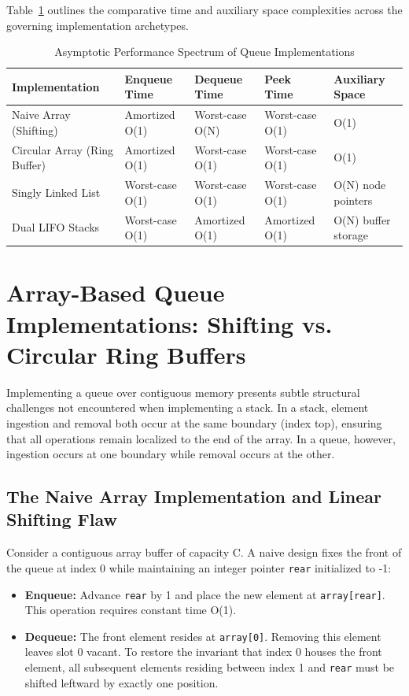 \documentclass[10pt,journal,compsoc,onecolumn]{IEEEtran}
\begin{document}
Table~\ref{tab:queue_implementations_comparison} outlines the comparative time and auxiliary space complexities across the governing implementation archetypes.

\begin{table}[htbp]
\centering
\caption{Asymptotic Performance Spectrum of Queue Implementations}
\label{tab:queue_implementations_comparison}
\begin{tabular}{lllll}
\toprule
\textbf{Implementation} & \textbf{Enqueue Time} & \textbf{Dequeue Time} & \textbf{Peek Time} & \textbf{Auxiliary Space} \\
\midrule
Naive Array (Shifting) & Amortized O(1) & Worst-case O(N) & Worst-case O(1) & O(1) \\
Circular Array (Ring Buffer) & Amortized O(1) & Worst-case O(1) & Worst-case O(1) & O(1) \\
Singly Linked List & Worst-case O(1) & Worst-case O(1) & Worst-case O(1) & O(N) node pointers \\
Dual LIFO Stacks & Worst-case O(1) & Amortized O(1) & Amortized O(1) & O(N) buffer storage \\
\bottomrule
\end{tabular}
\end{table}

\section{Array-Based Queue Implementations: Shifting vs. Circular Ring Buffers}
\label{sec:array_queue}

Implementing a queue over contiguous memory presents subtle structural challenges not encountered when implementing a stack. In a stack, element ingestion and removal both occur at the same boundary (index top), ensuring that all operations remain localized to the end of the array. In a queue, however, ingestion occurs at one boundary while removal occurs at the other.

\subsection{The Naive Array Implementation and Linear Shifting Flaw}

Consider a contiguous array buffer of capacity C. A naive design fixes the front of the queue at index 0 while maintaining an integer pointer \texttt{rear} initialized to -1:
\begin{itemize}
    \item \textbf{Enqueue:} Advance \texttt{rear} by 1 and place the new element at \texttt{array[rear]}. This operation requires constant time O(1).
    \item \textbf{Dequeue:} The front element resides at \texttt{array[0]}. Removing this element leaves slot 0 vacant. To restore the invariant that index 0 houses the front element, all subsequent elements residing between index 1 and \texttt{rear} must be shifted leftward by exactly one position.
\end{itemize}
\end{document}
